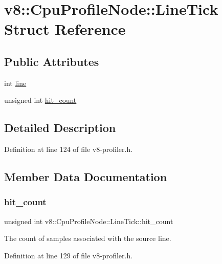 \hypertarget{structv8_1_1CpuProfileNode_1_1LineTick}{}\section{v8\+:\+:Cpu\+Profile\+Node\+:\+:Line\+Tick Struct Reference}
\label{structv8_1_1CpuProfileNode_1_1LineTick}
\subsection*{Public Attributes}
\begin{DoxyCompactItemize}
\item 
int \mbox{\hyperlink{structv8_1_1CpuProfileNode_1_1LineTick_af96fbdefbc07b2c84cf41d74555626f6}{line}}
\item 
unsigned int \mbox{\hyperlink{structv8_1_1CpuProfileNode_1_1LineTick_a62653fb1e6d381a5747d24b83aab1c1b}{hit\+\_\+count}}
\end{DoxyCompactItemize}


\subsection{Detailed Description}


Definition at line 124 of file v8-\/profiler.\+h.



\subsection{Member Data Documentation}
\mbox{\label{structv8_1_1CpuProfileNode_1_1LineTick_a62653fb1e6d381a5747d24b83aab1c1b}} 
\subsubsection{\texorpdfstring{hit\+\_\+count}{hit\_count}}
{\footnotesize\ttfamily unsigned int v8\+::\+Cpu\+Profile\+Node\+::\+Line\+Tick\+::hit\+\_\+count}

The count of samples associated with the source line. 

Definition at line 129 of file v8-\/profiler.\+h.

